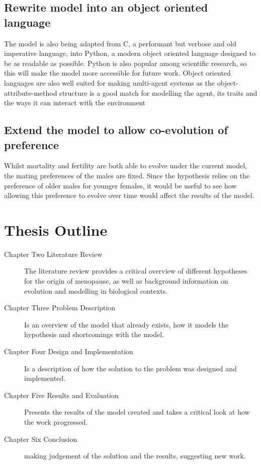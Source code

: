 \documentclass[authoryearcitations]{UoYCSproject}
\begin{document}
\subsection{Rewrite model into an object oriented language}
The model is also being adapted from C, a performant but verbose and old imperative language, into Python, a modern object oriented language designed to be as readable as possible. Python is also popular among scientific research, so this will make the model more accessible for future work. Object oriented languages are also well suited for making multi-agent systems as the object-attribute-method structure is a good match for modelling the agent, its traits and the ways it can interact with the environment

\subsection{Extend the model to allow co-evolution of preference}
Whilst mortality and fertility are both able to evolve under the current model, the mating preferences of the males are fixed. Since the hypothesis relies on the preference of older males for younger females, it would be useful to see how allowing this preference to evolve over time would affect the results of the model.

\section{Thesis Outline}
\begin{description}

\item[Chapter Two Literature Review] The literature review provides a critical overview of different hypotheses for the origin of menopause, as well as background information on evolution and modelling in biological contexts.
\item[Chapter Three Problem Description] Is an overview of the model that already exists, how it models the hypothesis and shortcomings with the model.
\item[Chapter Four Design and Implementation] Is a description of how the solution to the problem was designed and implemented.

\item[Chapter Five Results and Evaluation] Presents the results of the model created and takes a critical look at how the work progressed.

\item[Chapter Six Conclusion] making judgement of the solution and the results, suggesting new work.

\end{description}
\end{document}
